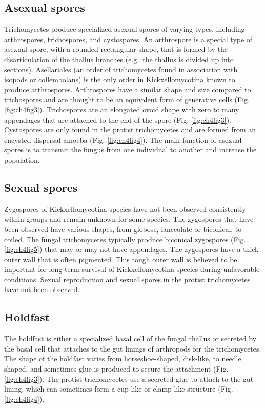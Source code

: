 \documentclass[]{book}
\begin{document}
\hypertarget{asexual-spores}{%
\subsection{Asexual spores}\label{asexual-spores}}

Trichomycetes produce specialized asexual spores of varying types, including arthrospores, trichospores, and cystospores. An arthrospore is a special type of asexual spore, with a rounded rectangular shape, that is formed by the disarticulation of the thallus branches (e.g.~the thallus is divided up into sections). Asellariales (an order of trichomycetes found in association with isopods or collembolans) is the only order in Kickxellomycotina known to produce arthrospores. Arthrospores have a similar shape and size compared to trichospores and are thought to be an equivalent form of generative cells (Fig. \ref{fig:ch4fig3}). Trichospores are an elongated ovoid shape with zero to many appendages that are attached to the end of the spore (Fig. \ref{fig:ch4fig3}). Cystospores are only found in the protist trichomycetes and are formed from an encysted dispersal amoeba (Fig. \ref{fig:ch4fig4}). The main function of asexual spores is to transmit the fungus from one individual to another and increase the population.

\hypertarget{sexual-spores}{%
\subsection{Sexual spores}\label{sexual-spores}}

Zygospores of Kickxellomycotina species have not been observed consistently within groups and remain unknown for some species. The zygospores that have been observed have various shapes, from globose, lanceolate or biconical, to coiled. The fungal trichomycetes typically produce biconical zygospores (Fig. \ref{fig:ch4fig5}) that may or may not have appendages. The zygospores have a thick outer wall that is often pigmented. This tough outer wall is believed to be important for long term survival of Kickxellomycotina species during unfavorable conditions. Sexual reproduction and sexual spores in the protist trichomycetes have not been observed.

\hypertarget{holdfast}{%
\subsection{Holdfast}\label{holdfast}}

The holdfast is either a specialized basal cell of the fungal thallus or secreted by the basal cell that attaches to the gut linings of arthropods for the trichomycetes. The shape of the holdfast varies from horseshoe-shaped, disk-like, to needle shaped, and sometimes glue is produced to secure the attachment (Fig. \ref{fig:ch4fig3}). The protist trichomycetes use a secreted glue to attach to the gut lining, which can sometimes form a cup-like or clamp-like structure (Fig. \ref{fig:ch4fig4}).
\end{document}
